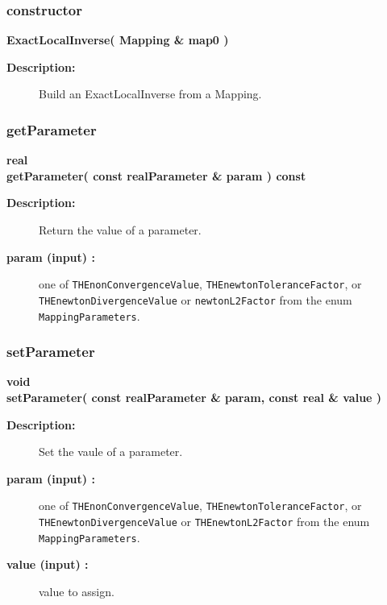 \subsubsection{constructor}
 
\newlength{\ExactLocalInverseIncludeArgIndent}
\begin{flushleft} \textbf{%
\settowidth{\ExactLocalInverseIncludeArgIndent}{ExactLocalInverse(}%
ExactLocalInverse( Mapping \& map0 )
}\end{flushleft}
\begin{description}
\item[{\bf Description:}] 
    Build an ExactLocalInverse from a Mapping.
\end{description}
\subsubsection{getParameter}
 
\begin{flushleft} \textbf{%
real  \\ 
\settowidth{\ExactLocalInverseIncludeArgIndent}{getParameter(}%
getParameter( const  realParameter \& param ) const
}\end{flushleft}
\begin{description}
\item[{\bf Description:}] 
   Return the value of a parameter.
\item[{\bf param (input) :}]  one of {\tt THEnonConvergenceValue}, {\tt THEnewtonToleranceFactor},
     or {\tt THEnewtonDivergenceValue} or {\tt newtonL2Factor} from the enum {\tt MappingParameters}.
 
\end{description}
\subsubsection{setParameter}
 
\begin{flushleft} \textbf{%
void  \\ 
\settowidth{\ExactLocalInverseIncludeArgIndent}{setParameter(}%
setParameter( const  realParameter \& param, const real \& value ) 
}\end{flushleft}
\begin{description}
\item[{\bf Description:}] 
   Set the vaule of a parameter.
\item[{\bf param (input) :}]  one of {\tt THEnonConvergenceValue}, {\tt THEnewtonToleranceFactor},
     or {\tt THEnewtonDivergenceValue} or {\tt THEnewtonL2Factor}  from the enum {\tt MappingParameters}.
\item[{\bf value (input) :}]  value to assign.
 
\end{description}
